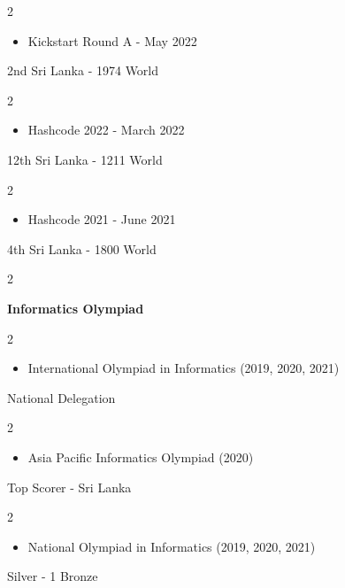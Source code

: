 \documentclass[10pt, letterpaper]{article}
\newenvironment{highlights}{
    \begin{itemize}[
        topsep=0.10 cm,
        parsep=0.10 cm,
        partopsep=0pt,
        itemsep=0pt,
        leftmargin=0 cm + 10pt
    ]
}{
    \end{itemize}
} %
\newenvironment{twocolentry}[2][]{
    \onecolentry
    \def\secondColumn{#2}
    \setcolumnwidth{\fill, 6.5 cm}
    \begin{paracol}{2}
}{
    \switchcolumn \raggedleft \secondColumn
    \end{paracol}
    \endonecolentry
} %
\begin{document}
\begin{twocolentry} {
    2nd Sri Lanka - 1974 World
}
    \begin{highlights}
        \item Kickstart Round A - May 2022
    \end{highlights}
\end{twocolentry}

\begin{twocolentry} {
    12th Sri Lanka - 1211 World
}
    \begin{highlights}
        \item Hashcode 2022 - March 2022
    \end{highlights}
\end{twocolentry}

\begin{twocolentry} {
    4th Sri Lanka - 1800 World
}
    \begin{highlights}
        \item Hashcode 2021 - June 2021
    \end{highlights}
\end{twocolentry}

\vspace{0.20 cm}
\begin{twocolentry}{
        }
    \textbf{Informatics Olympiad}
\end{twocolentry}

\vspace{0.10 cm}
\begin{twocolentry} {
    National Delegation
}
    \begin{highlights}
        \item International Olympiad in Informatics (2019, 2020, 2021)
    \end{highlights}
\end{twocolentry}

\begin{twocolentry} {
    Top Scorer - Sri Lanka
}
    \begin{highlights}
        \item Asia Pacific Informatics Olympiad (2020)
    \end{highlights}
\end{twocolentry}

\begin{twocolentry} {
    2 Silver - 1 Bronze
}
    \begin{highlights}
        \item National Olympiad in Informatics (2019, 2020, 2021)
    \end{highlights}
\end{twocolentry}
\end{document}
